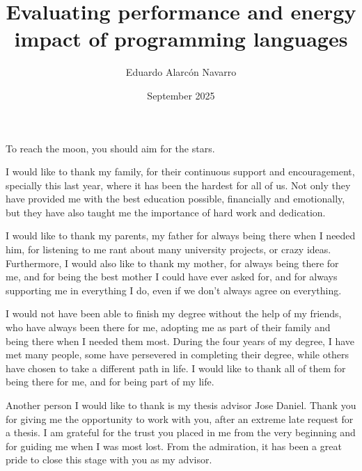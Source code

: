 \documentclass[en]{uc3mthesisIEEE}
\title{Evaluating performance and energy impact of programming languages}
\author{Eduardo Alarcón Navarro}
\date{September 2025}
\begin{document}
  \makecover


  \makeepigraph
    {To reach the moon, you should aim for the stars.}  %
    {}  %
    {}  %


  \begin{acknowledgements}
    I would like to thank my family, for their continuous support and encouragement, specially this last year, where it has been the hardest for all of us. Not only they have provided me with the best education possible, financially and emotionally, but they have also taught me the importance of hard work and dedication. 

    I would like to thank my parents, my father for always being there when I needed him, for listening to me rant about many university projects, or crazy ideas. Furthermore, I would also like to thank my mother, for always being there for me, and for being the best mother I could have ever asked for, and for always supporting me in everything I do, even if we don't always agree on everything.

    I would not have been able to finish my degree without the help of my friends, who have always been there for me, adopting me as part of their family and being there when I needed them most. During the four years of my degree, I have met many people, some have persevered in completing their degree, while others have chosen to take a different path in life. I would like to thank all of them for being there for me, and for being part of my life. 

    Another person I would like to thank is my thesis advisor Jose Daniel. Thank you for giving me the opportunity to work with you, after an extreme late request for a thesis. I am grateful for the trust you placed in me from the very beginning and for guiding me when I was most lost. From the admiration, it has been a great pride to close this stage with you as my advisor.


  \end{acknowledgements}
\end{document}
